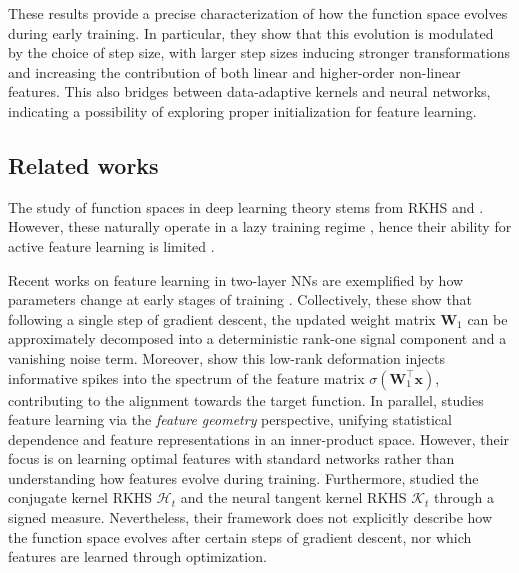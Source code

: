 These results provide a precise characterization of how the function space evolves during early training. In particular, they show that this evolution is modulated by the choice of step size, with larger step sizes inducing stronger transformations and increasing the contribution of both linear and higher-order non-linear features. This also bridges between data-adaptive kernels and neural networks, indicating a possibility of exploring proper initialization for feature learning.


\subsection{Related works}

The study of function spaces in deep learning theory stems from RKHS \citep{jacot2018neural_mini} and \citep{lee2017deep_mini}. However, these naturally operate in a lazy training regime \citep{chizat2019lazy_mini}, hence their ability for active feature learning is limited \citep{ghorbani2019limitations_mini}.

Recent works on feature learning in two-layer NNs are exemplified by how parameters change at early stages of training \citep{ba2022high,dandi2023two}. Collectively, these show that following a single step of gradient descent, the updated weight matrix $\bm W_1$ can be approximately decomposed into a deterministic rank-one signal component and a vanishing noise term. Moreover, \cite{moniri2023theory,cui2024asymptotics,dandi2024random} show this low-rank deformation injects informative spikes into the spectrum of the feature matrix $\sigma(\bm W_1^\top \bm x)$, contributing to the alignment towards the target function.
In parallel, \cite{Xu2024NeuralFL} studies feature learning via the \emph{feature geometry} perspective, unifying statistical dependence and feature representations in an inner-product space. However, their focus is on learning optimal features with standard networks rather than understanding how features evolve during training. Furthermore, \cite{dou2021training} studied the conjugate kernel RKHS $\mathcal{H}_t$ and the neural tangent kernel RKHS $\mathcal{K}_t$ through a signed measure. Nevertheless, their framework does not explicitly describe how the function space evolves after certain steps of gradient descent, nor which features are learned through optimization.

